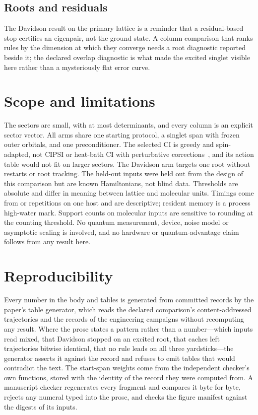 \documentclass[aps,pra,reprint,superscriptaddress,nofootinbib,floatfix,
  showkeys,raggedbottom]{revtex4-2}
\begin{document}
\subsection{Roots and residuals}

The Davidson result on the primary lattice is a reminder that a residual-based
stop certifies an eigenpair, not the ground state. A column comparison that
ranks rules by the dimension at which they converge needs a root diagnostic
reported beside it; the declared overlap diagnostic is what made the excited
singlet visible here rather than a mysteriously flat error curve.

\section{Scope and limitations}
\label{sec:limitations}

The sectors are small, with at most \pkPrimaryDeterminants{} determinants, and
every column is an explicit sector vector. All arms share one starting
protocol, a \pkStartSpace{} singlet span with frozen outer orbitals, and one
preconditioner. The selected CI is greedy and spin-adapted, not CIPSI or
heat-bath CI with perturbative corrections~\cite{huron1973cipsi,
holmes2016hci}, and its action table would not fit on larger sectors. The
Davidson arm targets one root without restarts or root tracking. The held-out
inputs were held out from the design of this comparison but are known
Hamiltonians, not blind data. Thresholds are absolute and differ in meaning
between lattice and molecular units. Timings come from \pkMinRepeats{} or \pkMaxRepeats{}
repetitions on one host and are descriptive; resident memory is a process
high-water mark. Support counts on molecular inputs are sensitive to rounding
at the counting threshold. No quantum measurement, device, noise model or
asymptotic scaling is involved, and no hardware or quantum-advantage claim
follows from any result here.

\section{Reproducibility}
\label{sec:reproducibility}

Every number in the body and tables is generated from committed records by
the paper's table generator, which reads the declared comparison's
content-addressed trajectories and the records of the engineering campaigns
without recomputing any result. Where the prose states a pattern rather than a
number---which inputs read mixed, that Davidson stopped on an excited root,
that caches left trajectories bitwise identical, that no rule leads on all
three yardsticks---the generator asserts it against the record and refuses to
emit tables that would contradict the text. The start-span weights come from
the independent checker's own functions, stored with the identity of the
record they were computed from. A manuscript checker regenerates every
fragment and compares it byte for byte, rejects any numeral typed into the
prose, and checks the figure manifest against the digests of its inputs.
\end{document}
